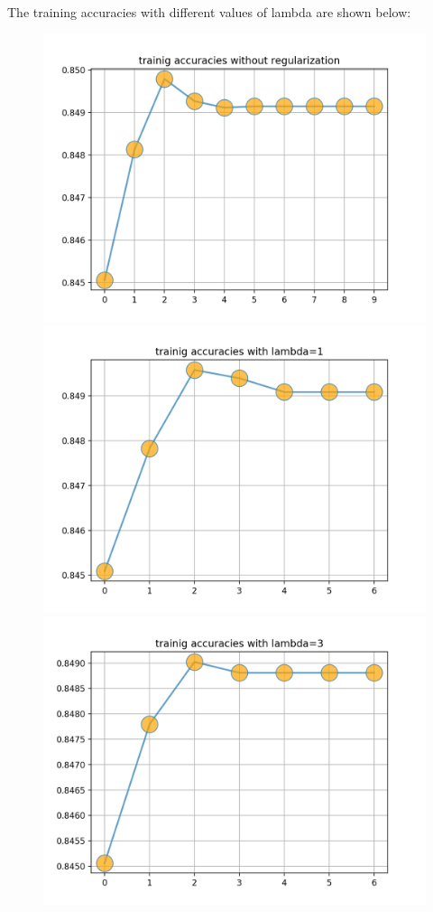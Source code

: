 \documentclass[12pt]{article}
\begin{document}
The training accuracies with different values of lambda are shown below:
\begin{figure}[ht]
\centering
\includegraphics[scale=0.47]{t0.png}
\includegraphics[scale=0.47]{t1.png}
\includegraphics[scale=0.47]{t3.png}

\end{figure}
\end{document}
